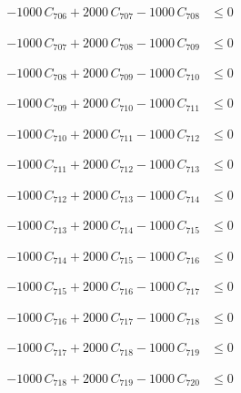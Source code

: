\documentclass[a4paper,11pt]{article}
\begin{document}
\begin{align}
-1000\,C_{706} + 2000\,C_{707} - 1000\,C_{708} &\leq 0 \nonumber
\end{align}

\begin{align}
-1000\,C_{707} + 2000\,C_{708} - 1000\,C_{709} &\leq 0 \nonumber
\end{align}

\begin{align}
-1000\,C_{708} + 2000\,C_{709} - 1000\,C_{710} &\leq 0 \nonumber
\end{align}

\begin{align}
-1000\,C_{709} + 2000\,C_{710} - 1000\,C_{711} &\leq 0 \nonumber
\end{align}

\begin{align}
-1000\,C_{710} + 2000\,C_{711} - 1000\,C_{712} &\leq 0 \nonumber
\end{align}

\begin{align}
-1000\,C_{711} + 2000\,C_{712} - 1000\,C_{713} &\leq 0 \nonumber
\end{align}

\begin{align}
-1000\,C_{712} + 2000\,C_{713} - 1000\,C_{714} &\leq 0 \nonumber
\end{align}

\begin{align}
-1000\,C_{713} + 2000\,C_{714} - 1000\,C_{715} &\leq 0 \nonumber
\end{align}

\begin{align}
-1000\,C_{714} + 2000\,C_{715} - 1000\,C_{716} &\leq 0 \nonumber
\end{align}

\begin{align}
-1000\,C_{715} + 2000\,C_{716} - 1000\,C_{717} &\leq 0 \nonumber
\end{align}

\begin{align}
-1000\,C_{716} + 2000\,C_{717} - 1000\,C_{718} &\leq 0 \nonumber
\end{align}

\begin{align}
-1000\,C_{717} + 2000\,C_{718} - 1000\,C_{719} &\leq 0 \nonumber
\end{align}

\begin{align}
-1000\,C_{718} + 2000\,C_{719} - 1000\,C_{720} &\leq 0 \nonumber
\end{align}
\end{document}
